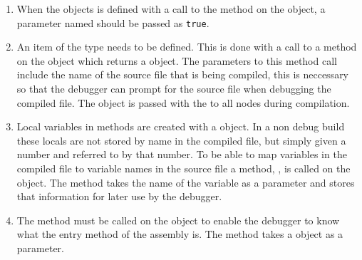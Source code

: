  	\begin{enumerate}
 		\item When the  objects is defined with a call to 
 		the  method on the  
 		object, a parameter named  should be passed as 
 		\texttt{true}.
 		
		\item An item of the type  needs to be 
		defined. This is done with a call to a  method on 
		the  object which returns a 
		 object. The parameters to this method call 
		include the name of the source file that is being compiled, this is 
		neccessary so that the debugger can prompt for the source file when 
		debugging the compiled file. The  object is 
		passed with the  to all nodes during compilation.

		\item Local variables in methods are created with a  
		object. In a non debug build these locals are not stored by name in the 
		compiled file, but simply given a number and referred to by that number.
		To be able to map variables in the compiled file to variable names in the
		source file a method, , is called on the 
		 object. The method takes the name of the variable as
		a parameter and stores that information for later use by the debugger.
		
		\item The method  must be called on the 
		 object to enable the debugger to know what the entry
		method of the assembly is. The method takes a  object
		as a parameter.
		

\end{enumerate}
